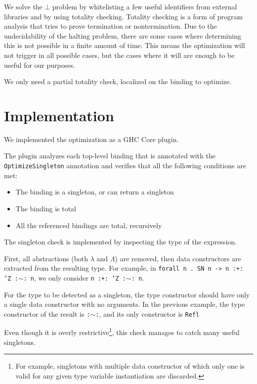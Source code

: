 We solve the $\bot$ problem by whitelisting a few useful identifiers from external libraries and by using totality checking.
Totality checking is a form of program analysis that tries to prove termination or nontermination.
Due to the undecidability of the halting problem, there are some cases where determining this is not possible in a finite amount of time.
This means the optimization will not trigger in all possible cases, but the cases where it will are enough to be useful for our purposes.

We only need a partial totality check, localized on the binding to optimize.

\section{Implementation}
\label{sec:implementation}

We implemented the optimization as a GHC Core plugin.

The plugin analyzes each top-level binding that is annotated with the \texttt{OptimizeSingleton} annotation and verifies that all the following conditions are met:

\begin{itemize}
  \item{The binding is a singleton, or can return a singleton}
  \item{The binding is total}
  \item{All the referenced bindings are total, recursively}
\end{itemize}

The singleton check is implemented by inspecting the type of the expression.

First, all abstractions (both $\lambda$ and $\Lambda$) are removed, then data constructors are extracted from the resulting type.
For example, in \texttt{forall n . SN n -> n :+: 'Z :$\sim$: n}, we only consider \texttt{n :+: 'Z :$\sim$: n}.

For the type to be detected as a singleton, the type constructor should have only a single data constructor with no arguments.
In the previous example, the type constructor of the result is \texttt{:$\sim$:}, and its only constructor is \texttt{Refl}

Even though it is overly restrictive\footnote{For example, singletons with multiple data constructor of which only one is valid for any given type variable instantiation are discarded.}, this check manages to catch many useful singletons.

